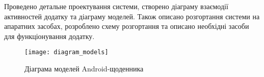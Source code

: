 \documentclass[../main.tex]{subfiles}
\begin{document}
Проведено детальне проектування системи, створено діаграму взаємодії активностей додатку та діаграму моделей. Також описано розгортання системи на апаратних засобах, розроблено схему розгортання та описано необхідні засоби для функціонування додатку.

\begin{figure}[pt] %
	\centering
	\texttt{[image: diagram\_models]}
	\caption{Діаграма моделей Android-щоденника} %
	\label{diagram:models}
\end{figure}
\end{document}
